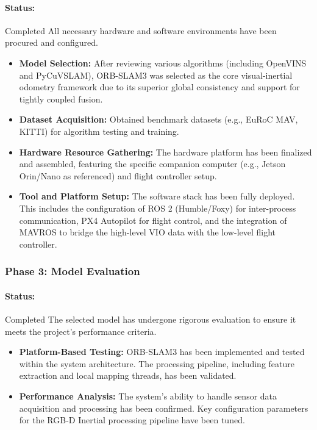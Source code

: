 \paragraph{Status:}Completed
All necessary hardware and software environments have been procured and configured.

\begin{itemize}
    \item \textbf{Model Selection:} After reviewing various algorithms (including OpenVINS and PyCuVSLAM), ORB-SLAM3 was selected as the core visual-inertial odometry framework due to its superior global consistency and support for tightly coupled fusion.

    \item \textbf{Dataset Acquisition:} Obtained benchmark datasets (e.g., EuRoC MAV, KITTI) for algorithm testing and training.

    \item \textbf{Hardware Resource Gathering:} The hardware platform has been finalized and assembled, featuring the specific companion computer (e.g., Jetson Orin/Nano as referenced) and flight controller setup.

    \item \textbf{Tool and Platform Setup:} The software stack has been fully deployed. This includes the configuration of ROS 2 (Humble/Foxy) for inter-process communication, PX4 Autopilot for flight control, and the integration of MAVROS to bridge the high-level VIO data with the low-level flight controller.
\end{itemize}

\subsubsection{Phase 3: Model Evaluation}
\paragraph{Status:}Completed
The selected model has undergone rigorous evaluation to ensure it meets the project's performance criteria.

\begin{itemize}
    \item \textbf{Platform-Based Testing:} ORB-SLAM3 has been implemented and tested within the system architecture. The processing pipeline, including feature extraction and local mapping threads, has been validated.

    \item \textbf{Performance Analysis:}  The system's ability to handle sensor data acquisition and processing has been confirmed. Key configuration parameters for the RGB-D Inertial processing pipeline have been tuned.
\end{itemize}

